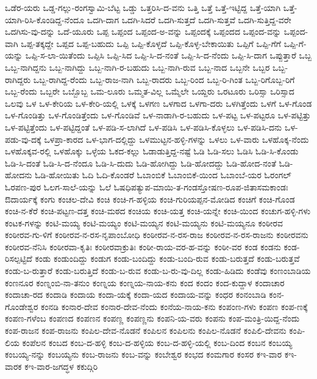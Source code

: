 {ಒಡೆರ-ಯರು
ಒಡ್ಡ-ಗಲ್ಲು-ರಂಗಸ್ವಾಮಿ-ಬೆಟ್ಟ
ಒಡ್ಡು
ಒತ್ತರಿಸಿ-ದ-ವನು
ಒತ್ತಿ
ಒತ್ತೆ
ಒತ್ತೆ-ಇಟ್ಟಿದ್ದ
ಒತ್ತೆ-ಯಾಗಿ
ಒತ್ತೆ-ಯಾಗಿ-ರಿಸಿ-ಕೊಂಡಿದ್ದ-ನೆಂದೂ
ಒದಗಿ-ದಾಗ
ಒದಗಿ-ಸಿದರೆ
ಒದಗಿ-ಸುತ್ತದೆ
ಒದಗಿ-ಸುತ್ತವೆ
ಒದಗಿ-ಸುತ್ತಿದ್ದ-ವರೇ
ಒದಗಿಸು-ವು-ದನ್ನು
ಒದೆ-ಯೂರು
ಒಪ್ಪ
ಒಪ್ಪಂದ
ಒಪ್ಪಂದ-ಅ-ವನ್ನು
ಒಪ್ಪಂದಕ್ಕೆ
ಒಪ್ಪಂದದ
ಒಪ್ಪಂದ-ವನ್ನು
ಒಪ್ಪಂದ-ವಾಗಿ
ಒಪ್ಪ-ತಕ್ಕದ್ದೇ
ಒಪ್ಪದ
ಒಪ್ಪ-ಬಹುದು
ಒಪ್ಪಿ
ಒಪ್ಪಿ-ಕೊಳ್ಳದೆ
ಒಪ್ಪಿ-ಕೊಳ್ಳ-ಬೇಕಾಯಿತು
ಒಪ್ಪಿಗೆ
ಒಪ್ಪಿ-ಗೆಗೆ
ಒಪ್ಪಿ-ಗೆ-ಯನ್ನು
ಒಪ್ಪಿ-ಸ-ಲಾ-ಯಿತೆಂದು
ಒಪ್ಪಿಸಿ
ಒಪ್ಪಿ-ಸಿದ
ಒಪ್ಪಿ-ಸಿ-ದ-ನಂತೆ
ಒಪ್ಪಿ-ಸಿ-ದ-ನೆಂದು
ಒಪ್ಪಿ-ಸಿ-ದಾಗ
ಒಪ್ಪುತ್ತಾರೆ
ಒಬ್ಬ
ಒಬ್ಬ-ನಾಗಿದ್ದನು
ಒಬ್ಬ-ನಾಗಿದ್ದು
ಒಬ್ಬ-ನಾಗಿ-ರ-ಬಹುದು
ಒಬ್ಬ-ನಾಗಿ-ರುವ
ಒಬ್ಬ-ನಾದ
ಒಬ್ಬನೇ
ಒಬ್ಬರ
ಒಬ್ಬ-ರಾಗಿದ್ದರು
ಒಬ್ಬ-ರಾಗಿದ್ದ-ರೆಂದು
ಒಬ್ಬ-ರಾಜ-ನಾಗಿ
ಒಬ್ಬ-ರಾದರು
ಒಬ್ಬ-ರಿಂದ
ಒಬ್ಬ-ರಿ-ಗಿಂತ
ಒಬ್ಬ-ರಿಗೊಬ್ಬ-ರಿಗೆ
ಒಬ್ಬ-ರೆಂದು
ಒಬ್ಬರೇ
ಒಬ್ಬೊಬ್ಬ
ಒಮ-ಲೂರು
ಒಮ್ಮತ-ವಿಲ್ಲ
ಒಮ್ಮೆಲೇ
ಒಯ್ದರು
ಒರಟೂರು
ಒರಿಸ್ಸಾ
ಒರಿಸ್ಸಾದ
ಒಲವು
ಒಳ
ಒಳ-ಕೇರಿಯ
ಒಳ-ಕೇರಿ-ಯಲ್ಲಿ
ಒಳಕ್ಕೆ
ಒಳಗಣ
ಒಳಗಾದ
ಒಳಗಾ-ದರು
ಒಳಗಿತ್ತೆಂದು
ಒಳಗೆ
ಒಳ-ಗೊಂಡ
ಒಳ-ಗೊಂಡಿತ್ತು
ಒಳ-ಗೊಂಡಿತ್ತೆಂದು
ಒಳ-ಗೊಂಡಿವೆ
ಒಳ-ನಾಡಾಗಿ-ರ-ಬಹುದು
ಒಳ-ಪಟ್ಟ
ಒಳ-ಪಟ್ಟರೂ
ಒಳ-ಪಟ್ಟಿತ್ತು
ಒಳ-ಪಟ್ಟಿತ್ತೆಂದು
ಒಳ-ಪಟ್ಟಿದ್ದಂತೆ
ಒಳ-ಪಡಿ-ಸ-ಲಾಗಿದೆ
ಒಳ-ಪಡಿಸಿ
ಒಳ-ಪಡಿಸಿ-ಕೊಳ್ಳಲು
ಒಳ-ಪಡಿಸಿ-ದನು
ಒಳ-ಪಡು-ವು-ದಕ್ಕೆ
ಒಳಪ್ರಾ-ಕಾರದ
ಒಳ-ಭಾಗ-ದಲ್ಲಿದ್ದು
ಒಳಮುಟ್ಟನ-ಹಳ್ಳಿ-ಗಳನ್ನು
ಒಳಲು
ಒಳ-ವಾರು
ಒಳಹೊಕ್ಕ-ನೆಂದು
ಒಳಹೊಕ್ಕವ-ರಲ್ಲಿ
ಒಳಹೊಕ್ಕು
ಒಳ್ಳೆಯ
ಓಕದ-ಕಲ್ಲು
ಓಡಾಡುತ್ತಿದ್ದ-ನಷ್ಟೆ
ಓಡಿ
ಓಡಿ-ಸಲು
ಓಡಿಸಿ
ಓಡಿ-ಸಿ-ಕೊಂಡು
ಓಡಿ-ಸಿ-ದಂತೆ
ಓಡಿ-ಸಿ-ದ-ನೆಂದೂ
ಓಡಿ-ಸಿ-ದುದು
ಓಡಿ-ಹೋಗಿದ್ದು
ಓಡಿ-ಹೋದದ್ದು
ಓಡಿ-ಹೋದ-ನಂತೆ
ಓಡಿ-ಹೋದನು
ಓಡಿ-ಹೋಯಿತು
ಓದಿ
ಓದಿ-ಕೊಂಡರೆ
ಓಬಾಂಬಿಕೆ
ಓಬಾಂಬಿಕೆ-ಯಿಂದ
ಓಬಾಂಬೆ-ಯರ
ಓರಂಗಲ್
ಓರಪಣ-ಪುರ
ಓಲಗ-ಸಾಲೆ-ಯನ್ನು
ಓಲೆ
ಓಷಧಿಪತ್ಯುಪ-ಮಾಯಿ-ತ-ಗಂಡಸ್ತೋಷಣ-ರೂಪ-ಜಿತಾಸಮಕಾಂಡಃ
ಔದಾರ್ಯಕ್ಕೆ
ಕಂಗು
ಕಂಚಲ-ದೇವಿ
ಕಂಚಿ
ಕಂಚಿ-ಗ-ಹಳ್ಳಿಯ
ಕಂಚಿ-ಗುರಿಯಪ್ಪನ-ಮೋಡಿದ
ಕಂಚಿಗೆ
ಕಂಚಿ-ಗೊಂಡ
ಕಂಚಿ-ನ-ಕೆರೆ
ಕಂಚಿ-ಪಟ್ಟಣ-ದತ್ತ
ಕಂಚಿ-ಮಠದ
ಕಂಚಿಯ
ಕಂಚಿ-ಯತ್ತ
ಕಂಚಿ-ಯನ್ನೇ
ಕಂಚಿ-ಯಿಂದ
ಕಂಚುಗ-ಹಳ್ಳಿ-ಗಳು
ಕಂಟಕ-ಗಳನ್ನು
ಕಂಟಿ-ಮಯ್ಯ
ಕಂಟಿ-ಮಯ್ಯಂ
ಕಂಟಿ-ಮಯ್ಯನ
ಕಂಟಿ-ಮಯ್ಯನು
ಕಂಟಿ-ಮಯ್ಯನೂ
ಕಂಠೀರವ
ಕಂಠೀರವ-ಗು-ಳಿಗೆ
ಕಂಠೀರವ-ನ-ರಸ-ನೃಪಾಂಬೋಧಿ
ಕಂಠೀರವ-ನ-ರಸ-ರಾಜ
ಕಂಠೀರವ-ನ-ರಸ-ರಾಜನು
ಕಂಠೀರವನು
ಕಂಠೀರವ-ನೆನಿಸಿ
ಕಂಠೀರವಾ-ಕೃತಿಃ
ಕಂಠೀರವಾಕ್ರುತಿಃ
ಕಂಠೀ-ರಾಯ-ವರ-ಹ-ವನ್ನು
ಕಂಠೀ-ವರ
ಕಂಡ
ಕಂಡನು
ಕಂಡ-ರಿಸಲ್ಪಟ್ಟಿದೆ
ಕಂಡು
ಕಂಡುಂದಿದ್ದು
ಕಂಡುಗ
ಕಂಡು-ಬಂದಿದ್ದು
ಕಂಡು-ಬಂದಿ-ರುವ
ಕಂಡು-ಬರುತ್ತದೆ
ಕಂಡು-ಬರುತ್ತವೆ
ಕಂಡು-ಬ-ರುತ್ತಾರೆ
ಕಂಡು-ಬರುತ್ತಿದೆ
ಕಂಡು-ಬ-ರುವ
ಕಂಡು-ಬ-ರು-ವು-ದಿಲ್ಲ
ಕಂಡು-ಹಿಡಿದು
ಕಂಡೆವು
ಕಂಣಂಬಾಡಿಯ
ಕಂಣನೂರ
ಕಂಣ್ನಂಬಿ-ನಾ-ತನುಂ
ಕಂಣ್ನಯ
ಕಂಣ್ನಯ-ನಾಯ-ಕನು
ಕಂದ
ಕಂದಂ
ಕಂದ-ಕುದ್ದಾಳ
ಕಂದಾಚಾರ
ಕಂದಾಚಾ-ರದ
ಕಂದಾಡಿ
ಕಂದಾಯ
ಕಂದಾ-ಯಕ್ಕೆ
ಕಂದಾ-ಯದ
ಕಂದಾಯ-ವನ್ನು
ಕಂಧರ
ಕಂನಂಬಾಡಿ
ಕಂನ-ಗೊಂಡೇಶ್ವರ
ಕಂನಡಿ
ಕಂನಾರ-ದೇವ
ಕಂನಾರ-ದೇವ-ನೆಂದು
ಕಂನೆಯ-ನಾಯ-ಕನು
ಕಂಪಂಣ-ಗಳು
ಕಂಪಣ
ಕಂಪ-ಣಕ್ಕೆ
ಕಂಪಣ-ಗಳೆಂಬ
ಕಂಪಣದ
ಕಂಪಣನ
ಕಂಪಣ್ಣ
ಕಂಪಣ್ಣನು
ಕಂಪನಿ-ಯ-ವರು
ಕಂಪನು
ಕಂಪ-ಮಂತ್ರಿ-ಯಿದ್ದ-ನೆಂದು
ಕಂಪ-ರಾಜನ
ಕಂಪ-ರಾಜನು
ಕಂಪಿಲ-ದೇವ-ನೊಡನೆ
ಕಂಪಿಲನ
ಕಂಪಿಲನು
ಕಂಪಿಲ-ನೊಡನೆ
ಕಂಪಿಲಿ-ದೇವನು
ಕಂಪಿ-ಲಿಯ
ಕಂಪೆಲನ
ಕಂಬದ
ಕಂಬ-ದ-ಹಳ್ಳಿ
ಕಂಬ-ದ-ಹಳ್ಳಿಯ
ಕಂಬ-ದ-ಹಳ್ಳಿ-ಯಲ್ಲಿ
ಕಂಬ-ದಿಂದ
ಕಂಬನ
ಕಂಬಯ್ಯ
ಕಂಬಯ್ಯ-ನನ್ನು
ಕಂಬಯ್ಯನು
ಕಂಬ-ರಾಜನು
ಕಂಬ-ವನ್ನು
ಕಂಬೇಶ್ವರ
ಕಂಭದ
ಕಂಮಗಾರ
ಕಂಸರ
ಕಇ-ವಾರ
ಕಇ-ವಾರಕ
ಕಇ-ವಾರ-ಜಗದ್ಧಳ
ಕಕುದ್ಗಿರಿ
}

